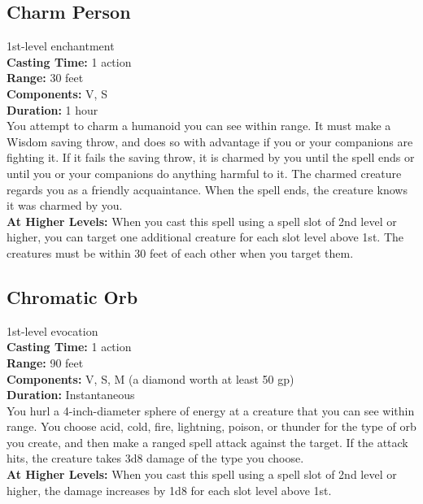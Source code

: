 \documentclass[11pt, A4paper, english]{article}
\begin{document}
		\subsection{Charm Person}
1st-level enchantment \\
\textbf{Casting Time:} 1 action \\
\textbf{Range:} 30 feet \\
\textbf{Components:} V, S \\
\textbf{Duration:} 1 hour \\
You attempt to charm a humanoid you can see within range. It must make a Wisdom saving throw, and does so with advantage if you or your companions are fighting it. If it fails the saving throw, it is charmed by you until the spell ends or until you or your companions do anything harmful to it. The charmed creature regards you as a friendly acquaintance. When the spell ends, the creature knows it was charmed by you. \\
\textbf{At Higher Levels:} When you cast this spell using a spell slot of 2nd level or higher, you can target one additional creature for each slot level above 1st. The creatures must be within 30 feet of each other when you target them.

		\subsection{Chromatic Orb}
1st-level evocation \\
\textbf{Casting Time:} 1 action \\
\textbf{Range:} 90 feet \\
\textbf{Components:} V, S, M (a diamond worth at least 50 gp) \\ \textbf{Duration:} Instantaneous \\
You hurl a 4-inch-diameter sphere of energy at a creature that you can see within range. You choose acid, cold, fire, lightning, poison, or thunder for the type of orb you create, and then make a ranged spell attack against the target. If the attack hits, the creature takes 3d8 damage of the type you choose. \\
\textbf{At Higher Levels:} When you cast this spell using a spell slot of 2nd level or higher, the damage increases by 1d8 for each slot level above 1st.
\end{document}
